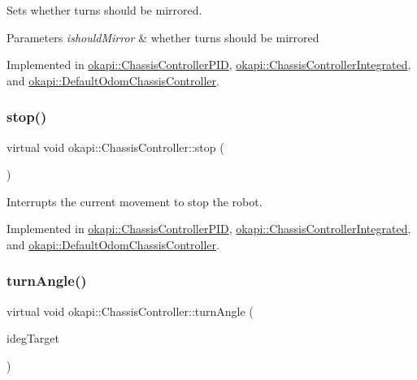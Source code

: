 Sets whether turns should be mirrored.


\begin{DoxyParams}{Parameters}
{\em ishould\+Mirror} & whether turns should be mirrored \\
\hline
\end{DoxyParams}


Implemented in \mbox{\hyperlink{classokapi_1_1ChassisControllerPID_a1e68419f6e695fd35576a6d886618741}{okapi\+::\+Chassis\+Controller\+P\+ID}}, \mbox{\hyperlink{classokapi_1_1ChassisControllerIntegrated_a37d538f92439644efa50a226c3cefd6d}{okapi\+::\+Chassis\+Controller\+Integrated}}, and \mbox{\hyperlink{classokapi_1_1DefaultOdomChassisController_aed92ba0b7a9fc15bf645f3789e8598ae}{okapi\+::\+Default\+Odom\+Chassis\+Controller}}.

\mbox{\label{classokapi_1_1ChassisController_ac67edbbbe1c8480c4503b9875a3719cd}} 
\subsubsection{\texorpdfstring{stop()}{stop()}}
{\footnotesize\ttfamily virtual void okapi\+::\+Chassis\+Controller\+::stop (\begin{DoxyParamCaption}{ }\end{DoxyParamCaption})\hspace{0.3cm}{\ttfamily [pure virtual]}}

Interrupts the current movement to stop the robot. 

Implemented in \mbox{\hyperlink{classokapi_1_1ChassisControllerPID_a852462fc20fb2322bbb3fd984b01a121}{okapi\+::\+Chassis\+Controller\+P\+ID}}, \mbox{\hyperlink{classokapi_1_1ChassisControllerIntegrated_aab2f5d5cfb8ad96bd32be26a5a4e7113}{okapi\+::\+Chassis\+Controller\+Integrated}}, and \mbox{\hyperlink{classokapi_1_1DefaultOdomChassisController_af6a98415e2c4e17dfec77e215efb1a41}{okapi\+::\+Default\+Odom\+Chassis\+Controller}}.

\mbox{\label{classokapi_1_1ChassisController_aab12308b3fad6793c007d7a33730a3f7}} 
\subsubsection{\texorpdfstring{turnAngle()}{turnAngle()}\hspace{0.1cm}{\footnotesize\ttfamily [1/2]}}
{\footnotesize\ttfamily virtual void okapi\+::\+Chassis\+Controller\+::turn\+Angle (\begin{DoxyParamCaption}\item[{Q\+Angle}]{ideg\+Target }\end{DoxyParamCaption})\hspace{0.3cm}{\ttfamily [pure virtual]}}

